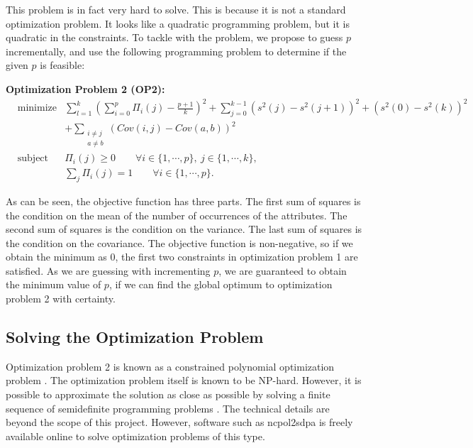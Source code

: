 This problem is in fact very hard to solve. This is because it is not a standard optimization problem. It looks like a quadratic programming problem, but it is quadratic in the constraints. To tackle with the problem, we propose to guess $p$ incrementally, and use the following programming problem to determine if the given $p$ is feasible:

\textbf{Optimization Problem 2 (OP2):}
\begin{equation*} \label{OP2}
	\begin{aligned}
		& \text{minimize} &\sum_{l = 1}^{k} \left(\sum_{i = 0}^{p} \Pi_i(j) - \frac{p+1}{k}\right)^2  + \sum_{j = 0}^{k-1} \left(s^2(j) - s^2(j+1)\right)^2 + \left(s^2(0) - s^2(k)\right)^2 \\
		&				  & + \sum_{\substack{i \neq j \\ a \neq b}} \left(Cov(i,j) - Cov(a,b)\right)^2 \\
		& \text{subject to} &\Pi_i(j) \geq 0 \qquad \forall i \in \{1, \cdots, p\}, \  j \in \{1, \cdots, k\}, \\
		&					 &\sum_{j}\Pi_i(j) = 1 \qquad \forall i \in \{1, \cdots, p\}.
	\end{aligned}
\end{equation*}

As can be seen, the objective function has three parts. The first sum of squares is the condition on the mean of the number of occurrences of the attributes. The second sum of squares is the condition on the variance. The last sum of squares is the condition on the covariance. The objective function is non-negative, so if we obtain the minimum as 0, the first two constraints in optimization problem 1 are satisfied. As we are guessing with incrementing $p$, we are guaranteed to obtain the minimum value of $p$, if we can find the global optimum to optimization problem 2 with certainty.


\subsection{Solving the Optimization Problem}
Optimization problem 2 is known as a constrained polynomial optimization problem \cite{Mevissen07introductionto}. The optimization problem itself is known to be NP-hard. However, it is possible to approximate the solution as close as possible by solving a finite sequence of semidefinite programming problems \cite{doi:10.1137/S1052623400366802}. The technical details are beyond the scope of this project. However, software such as ncpol2sdpa \cite{Wittek:2015:A9N:2786970.2699464} is freely available online to solve optimization problems of this type.


